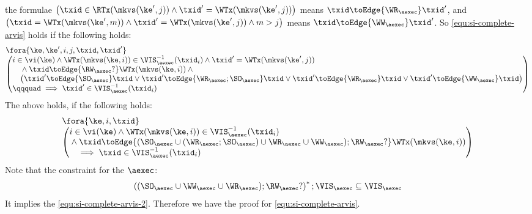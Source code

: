 \begin{itemize}
the formulae \(\left( \begin{array}{@{}l@{}} \txid \in \RTx(\mkvs(\ke',j)) \land \txid' = \WTx(\mkvs(\ke',j)) \end{array} \right) \) 
means \( \txid \toEdge{\WR_\aexec} \txid' \),
and \( \left( \begin{array}{@{}l@{}} \txid = \WTx(\mkvs(\ke',m)) \land \txid' = \WTx(\mkvs(\ke',j)) \land m > j \end{array} \right) \) 
means \( \txid \toEdge{\WW_\aexec} \txid' \).
So \cref{equ:si-complete-arvis} holds if the following holds:
\[
    \begin{array}{@{}l@{}}
        \fora{\ke, \ke', i, j, \txid, \txid'} \\
        \left( \begin{array}{@{}l@{}}
        i \in \vi(\ke) 
        \land \WTx(\mkvs(\ke,i)) \in \VIS^{-1}_{\aexec}(\txid_{i}) 
        \land \txid' = \WTx(\mkvs(\ke',j)) \\
        \quad {} \land \txid \toEdge{\RW_{\aexec}?} \WTx(\mkvs(\ke,i))  \land {} \\
        \quad \left(
        \begin{array}{@{}l @{}}
            \txid' \toEdge{\SO_\aexec} \txid \lor
            \txid' \toEdge{\WR_\aexec ; \SO_\aexec} \txid \lor
            \txid' \toEdge{\WR_\aexec} \txid \lor
            \txid' \toEdge{\WW_\aexec} \txid 
        \end{array}
        \right)  \\
        \qqquad \implies \txid' \in \VIS^{-1}_{\aexec}(\txid_{i})
        \end{array} \right)
    \end{array} \\
\]
The above holds, if the following holds:
\begin{gather}
    \label{equ:si-complete-arvis-2}
    \begin{array}{@{}l@{}}
        \fora{\ke, i, \txid} \\
        \left( \begin{array}{@{}l@{}}
        i \in \vi(\ke) 
        \land \WTx(\mkvs(\ke,i)) \in \VIS^{-1}_{\aexec}(\txid_{i})  \\
        {} \land \txid \toEdge{(\SO_\aexec \cup (\WR_\aexec ; \SO_\aexec ) \cup \WR_\aexec \cup \WW_\aexec ) ; \RW_{\aexec}?} \WTx(\mkvs(\ke,i))  \\
        \quad \implies \txid \in \VIS^{-1}_{\aexec}(\txid_{i})
        \end{array} \right)
    \end{array} 
\end{gather}
Note that the constraint for the \( \aexec \):
\[ 
    \left( (\SO_{\aexec} \cup \WW_{\aexec} \cup \WR_{\aexec} ) ; \RW_{\aexec}? \right)^* ; \VIS_{\aexec}  \subseteq \VIS_\aexec
\] 
It implies the \cref{equ:si-complete-arvis-2}.
Therefore we have the proof for \cref{equ:si-complete-arvis}.

\end{itemize}
